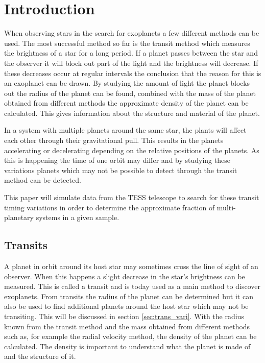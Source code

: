 \documentclass[12pt]{report}
\begin{document}
\newpage

\setcounter{page}{1} %

\tableofcontents

\newpage

\listoffigures 
\listoftables

\newpage

\chapter{Introduction}
When observing stars in the search for exoplanets a few different methods can be used. The most successful method so far is the transit method which measures the brightness of a star for a long period. If a planet passes between the star and the observer it will block out part of the light and the brightness will decrease. If these decreases occur at regular intervals the conclusion that the reason for this is an exoplanet can be drawn. By studying the amount of light the planet blocks out the radius of the planet can be found, combined with the mass of the planet obtained from different methods the approximate density of the planet can be calculated. This gives information about the structure and material of the planet.

In a system with multiple planets around the same star, the plants will affect each other through their gravitational pull. This results in the planets accelerating or decelerating depending on the relative positions of the planets. As this is happening the time of one orbit may differ and by studying these variations planets which may not be possible to detect through the transit method can be detected.

This paper will simulate data from the TESS telescope to search for these transit timing variations in order to determine the approximate fraction of multi-planetary systems in a given sample.

\section{Transits}
	A planet in orbit around its host star may sometimes cross the line of sight of an observer. When this happens a slight decrease in the star's brightness can be measured. This is called a transit and is today used as a main method to discover exoplanets. From transits the radius of the planet can be determined but it can also be used to find additional planets around the host star which may not be transiting. This will be discussed in section \ref{sec:trans_vari}. With the radius known from the transit method and the mass obtained from different methods such as, for example the radial velocity method, the density of the planet can be calculated. The density is important to understand what the planet is made of and the structure of it.
\end{document}
